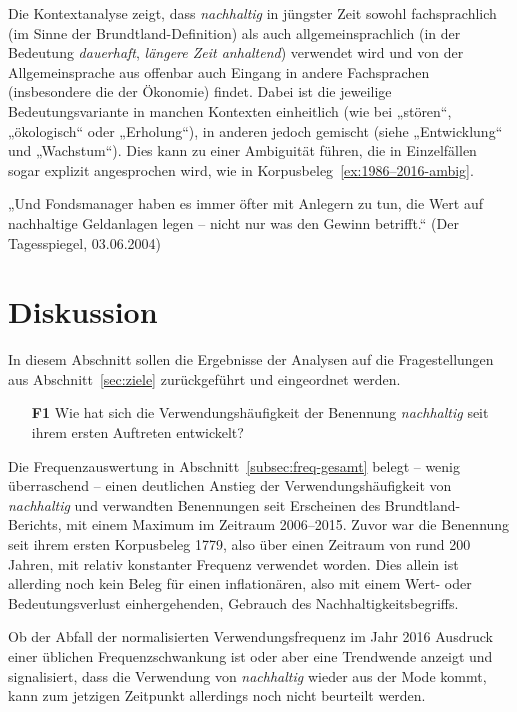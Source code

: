 \documentclass[
    german,
    a4paper,%
    12pt,%
    oneside,%
    toc=bibliography,
    final,
]{scrartcl}
\begin{document}
Die Kontextanalyse zeigt, dass \textit{nachhaltig} in jüngster Zeit sowohl fachsprachlich (im Sinne der Brundtland-Definition) als auch allgemeinsprachlich (in der Bedeutung \textit{dauerhaft}, \textit{längere Zeit anhaltend}) verwendet wird und von der Allgemeinsprache aus offenbar auch Eingang in andere Fachsprachen (insbesondere die der Ökonomie) findet. Dabei ist die jeweilige Bedeutungsvariante in manchen Kontexten einheitlich (wie bei „stören“, „ökologisch“ oder „Erholung“), in anderen jedoch gemischt (siehe „Entwicklung“ und „Wachstum“). Dies kann zu einer Ambiguität führen, die in Einzelfällen sogar explizit angesprochen wird, wie in Korpusbeleg~\ref{ex:1986–2016-ambig}.

\begin{exe}
\ex\label{ex:1986–2016-ambig} „Und Fondsmanager haben es immer öfter mit Anlegern zu tun, die Wert auf nachhaltige Geldanlagen legen – nicht nur was den Gewinn betrifft.“ (Der Tagesspiegel, 03.06.2004)
\end{exe}

\section{Diskussion}
\label{sec:diskussion}

In diesem Abschnitt sollen die Ergebnisse der Analysen auf die Fragestellungen aus Abschnitt~\ref{sec:ziele} zurückgeführt und eingeordnet werden.

\begin{enumerate}[rightmargin=1cm]
\item[\textbf{F1}] Wie hat sich die Verwendungshäufigkeit der Benennung \textit{nachhaltig} seit ihrem ersten Auftreten entwickelt?
\end{enumerate}

Die Frequenzauswertung in Abschnitt~\ref{subsec:freq-gesamt} belegt – wenig überraschend – einen deutlichen Anstieg der Verwendungshäufigkeit von \textit{nachhaltig} und verwandten Benennungen seit Erscheinen des Brundtland-Berichts, mit einem Maximum im Zeitraum 2006–2015. Zuvor war die Benennung seit ihrem ersten Korpusbeleg 1779, also über einen Zeitraum von rund 200 Jahren, mit relativ konstanter Frequenz verwendet worden. Dies allein ist allerding noch kein Beleg für einen inflationären, also mit einem Wert- oder Bedeutungsverlust einhergehenden, Gebrauch des Nachhaltigkeitsbegriffs.

Ob der Abfall der normalisierten Verwendungsfrequenz im Jahr 2016 Ausdruck einer üblichen Frequenzschwankung ist oder aber eine Trendwende anzeigt und signalisiert, dass die Verwendung von \textit{nachhaltig} wieder aus der Mode kommt, kann zum jetzigen Zeitpunkt allerdings noch nicht beurteilt werden.
\end{document}

